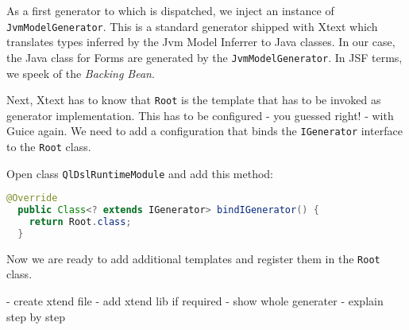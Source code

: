 As a first generator to which is dispatched, we inject an instance of
\texttt{JvmModelGenerator}. This is a standard generator shipped with Xtext which
translates types inferred by the Jvm Model Inferrer to Java classes.
In our case, the Java class for Forms are generated by the
\texttt{JvmModelGenerator}. In JSF terms, we speek of the \emph{Backing Bean}.
 
Next, Xtext has to know that \texttt{Root} is the template that has to be invoked
as generator implementation. This has to be configured - you guessed right! - 
with Guice again. We need to add a configuration that binds the \texttt{IGenerator}
interface to the \texttt{Root} class.

Open class \texttt{QlDslRuntimeModule} and add this method:

\begin{lstlisting}[language=Java]
  @Override
  public Class<? extends IGenerator> bindIGenerator() {
    return Root.class;
  }
\end{lstlisting}

Now we are ready to add additional templates and register them in the
\texttt{Root} class.

- create xtend file
- add xtend lib if required
- show whole generater
- explain step by step

